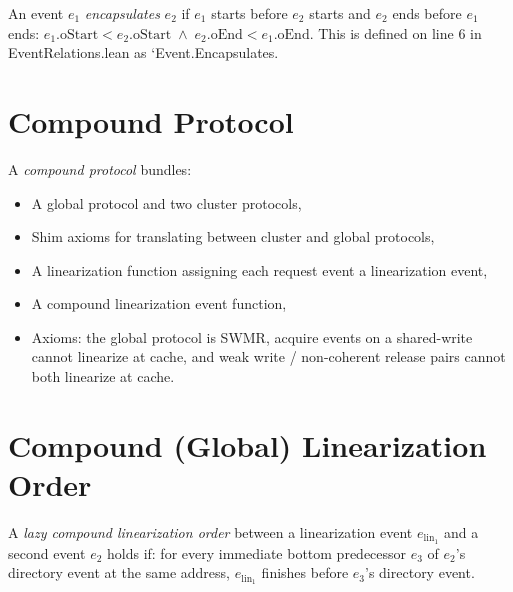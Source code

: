 \begin{definition}[Encapsulates]
  \label{def:Encapsulates}
  \leanok
  An event $e_1$ \emph{encapsulates} $e_2$ if $e_1$ starts before $e_2$ starts and
  $e_2$ ends before $e_1$ ends:
  $e_1.\mathrm{oStart} < e_2.\mathrm{oStart} \;\wedge\; e_2.\mathrm{oEnd} < e_1.\mathrm{oEnd}$.
  This is defined on line 6 in EventRelations.lean as `Event.Encapsulates.
\end{definition}

\section{Compound Protocol}
\label{sec:compound-protocol}

\begin{definition}
  \label{def:CompoundProtocol}
  \leanok
  A \emph{compound protocol} bundles:
  \begin{itemize}
    \item A global protocol and two cluster protocols,
    \item Shim axioms for translating between cluster and global protocols,
    \item A linearization function assigning each request event a linearization event,
    \item A compound linearization event function,
    \item Axioms: the global protocol is SWMR,
      acquire events on a shared-write cannot linearize at cache,
      and weak write / non-coherent release pairs cannot both linearize at cache.
  \end{itemize}
\end{definition}

\section{Compound (Global) Linearization Order}
\label{sec:global-linearization-order}

\begin{definition}
  \label{def:lazyCompoundLinearizationOrder}
  \leanok
  A \emph{lazy compound linearization order} between a linearization event $e_{\mathrm{lin}_1}$
  and a second event $e_2$ holds if: for every immediate bottom predecessor $e_3$ of
  $e_2$'s directory event at the same address, $e_{\mathrm{lin}_1}$ finishes before $e_3$'s
  directory event.
\end{definition}

